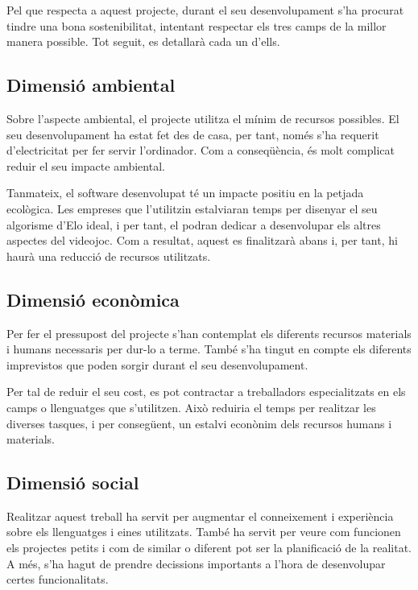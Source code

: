 \documentclass[a4paper]{article}
\begin{document}
Pel que respecta a aquest projecte, durant el seu desenvolupament s'ha procurat tindre una bona sostenibilitat, intentant respectar els tres camps de la millor manera possible. Tot seguit, es detallarà cada un d'ells.

\subsection{Dimensió ambiental}

Sobre l'aspecte ambiental, el projecte utilitza el mínim de recursos possibles. El seu desenvolupament ha estat fet des de casa, per tant, només s'ha requerit d'electricitat per fer servir l'ordinador. Com a conseqüència, és molt complicat reduir el seu impacte ambiental.

Tanmateix, el software desenvolupat té un impacte positiu en la petjada ecològica. Les empreses que l'utilitzin estalviaran temps per disenyar el seu algorisme d'Elo ideal, i per tant, el podran dedicar a desenvolupar els altres aspectes del videojoc. Com a resultat,  aquest es finalitzarà abans i, per tant, hi haurà una reducció de recursos utilitzats.

\subsection{Dimensió econòmica}

Per fer el pressupost del projecte s'han contemplat els diferents recursos materials i humans necessaris per dur-lo a terme. També s'ha tingut en compte els diferents imprevistos que poden sorgir durant el seu desenvolupament.

Per tal de reduir el seu cost, es pot contractar a treballadors especialitzats en els camps o llenguatges que s'utilitzen. Això reduiria el temps per realitzar les diverses tasques, i per consegüent, un estalvi econònim dels recursos humans i materials.

\subsection{Dimensió social}

Realitzar aquest treball ha servit per augmentar el conneixement i experiència sobre els llenguatges i eines utilitzats. També ha servit per veure com funcionen els projectes petits i com de similar o diferent pot ser la planificació de la realitat. A més, s'ha hagut de prendre decissions importants a l'hora de desenvolupar certes funcionalitats.
\end{document}
